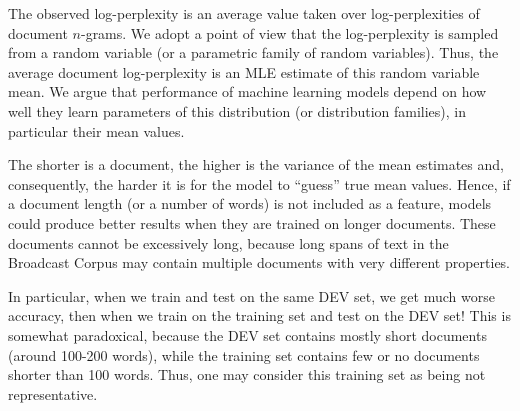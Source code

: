 \documentclass[11pt]{article}
\begin{document}
The observed log-perplexity is an average value taken over log-perplexities of document \mbox{$n$-grams}. 
We adopt a point of view that the log-perplexity is sampled from a random variable
(or a parametric family of random variables).
Thus, the average document log-perplexity is an MLE estimate of this random variable mean.
We argue that performance of machine learning models depend on how
well they learn parameters of this distribution (or distribution families), in particular their mean values.

The shorter is a document, the higher is the variance of the mean estimates
and, consequently, the harder it is for the model to ``guess'' true mean values.
Hence, if a document length (or a number of words)
is not included as a feature,
models could produce better results when they are trained on longer documents.
These documents cannot be excessively long,
because long spans of text in the Broadcast Corpus may contain multiple documents
with very different properties.

In particular, when we train and test on the same DEV set, we get much worse
accuracy, then when we train on the training set and test on the DEV set!
This is somewhat paradoxical, because the DEV set contains mostly short documents (around 100-200 words),
 while the training set contains few or no documents shorter than 100 words.
Thus, one may consider this training set as being not representative.
\end{document}
